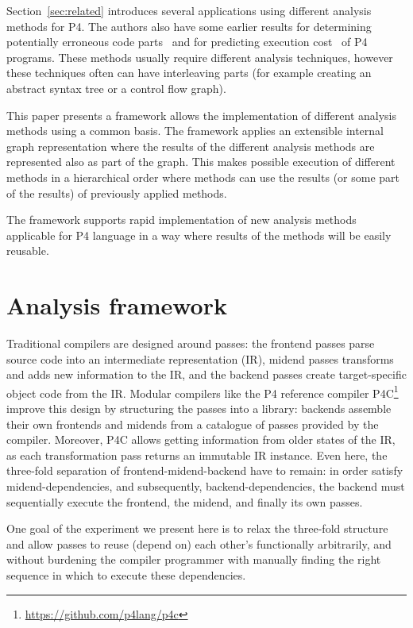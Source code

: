 \documentclass[sigconf]{acmart}
\begin{document}
Section~\ref{sec:related} introduces several applications using different analysis methods for P4. The authors also have some earlier results for determining potentially erroneous code parts~\cite{ownCheck} and for predicting execution cost~\cite{LukacsOcs} of P4 programs. These methods usually require different analysis techniques, however these techniques often can have interleaving parts (for example creating an abstract syntax tree or a control flow graph).

This paper presents a framework allows the implementation of different analysis methods using a common basis. The framework applies an extensible internal graph representation where the results of the different analysis methods are represented also as part of the graph. This makes possible execution of different methods in a hierarchical order where methods can use the results (or some part of the results) of previously applied methods. 

The framework supports rapid implementation of new analysis methods applicable for P4 language in a way where results of the methods will be easily reusable. 

	\section{Analysis framework}
Traditional compilers are designed around passes: the frontend passes parse source code into an intermediate representation (IR), midend passes transforms and adds new information to the IR, and the backend passes create target-specific object code from the IR.  
Modular compilers like the P4 reference compiler P4C\footnote{\url{https://github.com/p4lang/p4c}} improve this design by structuring the passes into a library: backends assemble their own frontends and midends from a catalogue of passes provided by the compiler. Moreover, P4C allows getting information from older states of the IR, as each transformation pass returns an immutable IR instance.
Even here, the three-fold separation of frontend-midend-backend have to remain: in order satisfy midend-dependencies, and subsequently, backend-dependencies, the backend must sequentially execute the frontend, the midend, and finally its own passes. 

One goal of the experiment we present here is to relax the three-fold structure and allow passes to reuse (depend on) each other's functionally arbitrarily, and without burdening the compiler programmer with manually finding the right sequence in which to execute these dependencies.
\end{document}
